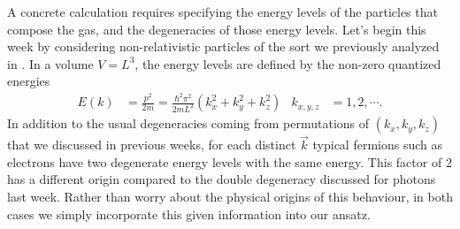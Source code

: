 A concrete calculation requires specifying the energy levels of the particles that compose the gas, and the degeneracies of those energy levels.
Let's begin this week by considering non-relativistic particles of the sort we previously analyzed in .
In a volume $V = L^3$, the energy levels are defined by the non-zero quantized energies
\begin{align*}
  E(k) & = \frac{p^2}{2m} = \frac{\hbar^2 \pi^2}{2mL^2}\left(k_x^2 + k_y^2 + k_z^2\right) &
  k_{x, y, z} & = 1, 2, \cdots.
\end{align*}
In addition to the usual degeneracies coming from permutations of $(k_x, k_y, k_z)$ that we discussed in previous weeks, for each distinct $\vec k$ typical fermions such as electrons have two degenerate energy levels with the same energy.
This factor of $2$ has a different origin compared to the double degeneracy discussed for photons last week.
Rather than worry about the physical origins of this behaviour, in both cases we simply incorporate this given information into our ansatz. %

